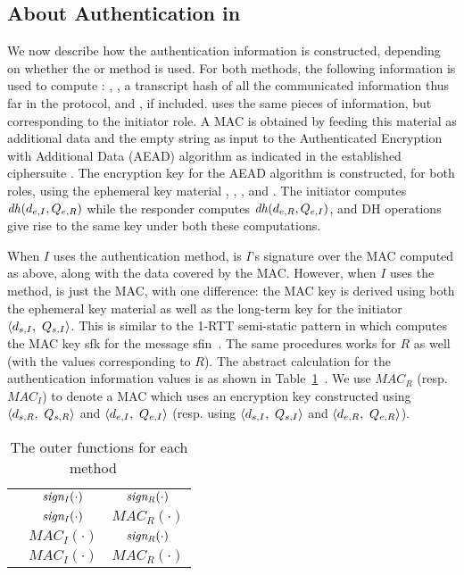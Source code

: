 \subsection{About Authentication in \mEdhoc{}}
\label{sec:edhocauth}
We now describe how the authentication information is constructed,
depending on whether the \mSig{} or \mStat{} method is used.
%
For both methods, the following information is used to compute
\mAuthr{}: \mIdcredr{}, \mCredr{}, a transcript hash of all the communicated
information thus far in the protocol, and \mADtwo{}, if included.
%
\mAuthi{} uses the same pieces of information, but corresponding to the
initiator role.
%
A MAC is obtained by feeding this material as additional data and the empty
string as input to the Authenticated Encryption with Additional Data (AEAD) algorithm as indicated in the established ciphersuite \mSuites{}.
%
The encryption key for the AEAD algorithm is constructed, for both roles,
using the ephemeral key material \mGx{}, \mGy{}, \mX{}, and \mY{}.
%
The initiator computes $\mathit{dh}(d_{e,I}, Q_{e,R})$ while the responder computes
$\mathit{dh}(d_{e,R}, Q_{e,I})$, and DH operations give rise to the same key under both
these computations.
%

When $I$ uses the \mSig{} authentication method, \mAuthi{} is $I$'s signature
over the MAC computed as above, along with the data covered by the MAC.
%
However, when $I$ uses the \mStat{} method, \mAuthi{} is just the MAC, with
one difference: the MAC key is derived using both the ephemeral key material
\mGxy{} as well as the long-term key for the initiator
$\langle\mPriv{I},\ \mPub{I}\rangle$.
%
This is similar to the 1-RTT semi-static pattern in \mOptls{} which computes the
MAC key \textsf{sfk} for the message
\textsf{sfin}~\cite{DBLP:conf/eurosp/KrawczykW16}.
%
The same procedures works for $R$ as well (with the values corresponding to
$R$).
%
The abstract calculation for the authentication information values is as shown
in Table~\ref{tab:authvalues}~\cite{Norr21}.
%
We use $\mathit{MAC}_{R}$ (resp. $\mathit{MAC}_{I}$) to denote a MAC
which uses
an encryption key constructed using
$\langle d_{s,R},\ Q_{s,R}\rangle$ and $\langle d_{e,I},\ Q_{e,I}\rangle$
(resp. using $\langle\mPriv{I},\ \mPub{I}\rangle$ and $\langle d_{e,R},\
Q_{e,R}\rangle$).
%
\begin{table}[ht]
\centering
\begin{tabular}{|c|c|c|}
        \hline
        \mMethod & \mAuthi & \mAuthr\\
        \hline
        \mSigSig{} & $\mathit{sign_{I}}(\cdot)$ & $\mathit{sign_{R}}(\cdot)$ \\
        \mSigStat{} & $\mathit{sign_{I}}(\cdot)$ & $\textit{MAC}_R(\cdot)$\\
        \mStatSig{} & $\textit{MAC}_I(\cdot)$ & $\mathit{sign_{R}}(\cdot)$\\
        \mStatStat{} & $\textit{MAC}_I(\cdot)$ & $\textit{MAC}_R(\cdot)$\\
        \hline
\end{tabular}
\caption{The outer functions for each method \mMethod{}~\cite{Norr21}}
\label{tab:authvalues}
\end{table}
%

